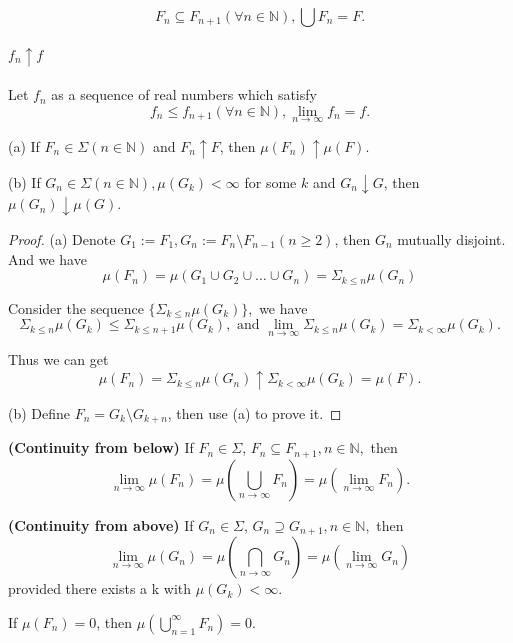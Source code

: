 $$F_n\subseteq F_{n+1}(\forall n\in \mathbb N),\bigcup F_n = F.$$

\paragraph{$f_n \uparrow f$} Let $f_n$ as a sequence of real numbers which satisfy
$$f_n \leq f_{n+1}(\forall n\in \mathbb N), \lim_{n\rightarrow\infty} f_n = f. $$



\begin{theorem}
  (a) If $F_n \in \Sigma(n\in \mathbb N)$ and $F_n\uparrow F$,  then $\mu(F_n) \uparrow\mu(F)$.
  
  (b) If $G_n \in \Sigma(n\in \mathbb N),\mu(G_k) < \infty$ for some $k$ and $G_n\downarrow G$,  then $\mu(G_n) \downarrow \mu(G)$.

\end{theorem}
\begin{proof}
  (a) Denote $G_1 := F_1,G_n := F_n\setminus F_{n-1}(n\geq 2)$, then $G_n$ mutually disjoint. And we have 
  $$\mu(F_n) = \mu(G_1\cup G_2 \cup \dots \cup G_n )= \Sigma_{k \leq n} \mu(G_n) $$  
  
  Consider the sequence $\{\Sigma_{k\leq n} \mu(G_k)\},$ we have 
  $$\Sigma_{k\leq n} \mu(G_k) \leq \Sigma_{k\leq n+1} \mu(G_k), \text{ and } \lim_{n\rightarrow \infty} \Sigma_{k\leq n} \mu(G_k) = \Sigma_{k <\infty} \mu(G_k).$$
  
  Thus we can get
  $$\mu(F_n) = \Sigma_{k \leq n} \mu(G_n) \uparrow \Sigma_{k <\infty} \mu(G_k) = \mu(F).$$
  
  
  (b) Define $F_n = G_k \setminus G_{k+n}$, then use (a) to prove it.
\end{proof}
 
 \begin{corollary}
   \textbf{(Continuity from below)} If $F_n\in \Sigma$, $F_n \subseteq F_{n+1}, n\in \mathbb N,$ then 
   $$\lim_{n\to \infty}\mu(F_n) = \mu(\bigcup_{n\to \infty} F_n) = \mu(\lim_{n\to \infty} F_n).$$
  \end{corollary}
  \begin{corollary} 
   \textbf{(Continuity from above)} If $G_n\in \Sigma$, $G_n \supseteq G_{n+1}, n\in \mathbb N,$ then 
   $$\lim_{n\to \infty}\mu(G_n) = \mu(\bigcap_{n\to \infty} G_n) = \mu(\lim_{n\to \infty} G_n)$$ provided there exists a k with $\mu(G_k) < \infty.$

 \end{corollary}
 
 
\begin{theorem}
  If $\mu(F_n) = 0$, then $\mu(\bigcup_{n=1}^\infty F_n) = 0$.
\end{theorem}

